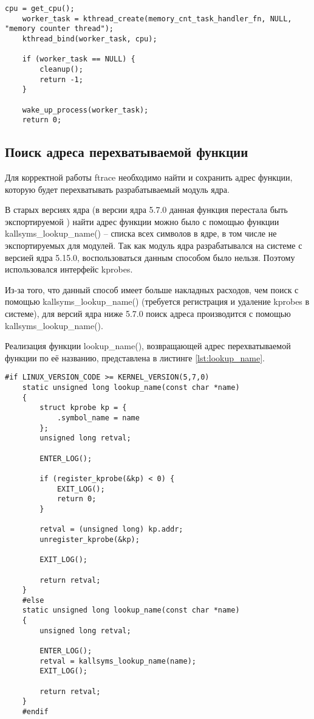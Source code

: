 \begin{lstlisting}[label={lst:threadinit}, caption={инициализация потока ядра}]
	cpu = get_cpu();
	worker_task = kthread_create(memory_cnt_task_handler_fn, NULL, "memory counter thread");
	kthread_bind(worker_task, cpu);
	
	if (worker_task == NULL) {
		cleanup();
		return -1;
	}
	
	wake_up_process(worker_task);
	return 0;
\end{lstlisting}

\subsection{Поиск адреса перехватываемой функции}

Для корректной работы ftrace необходимо найти и сохранить адрес функции, которую будет перехватывать разрабатываемый модуль ядра. 

В старых версиях ядра (в версии ядра 5.7.0 данная функция перестала быть экспортируемой \cite{kallsyms-removed}) найти адрес функции можно было с помощью функции kallsyms\_lookup\_name() -- списка всех символов в ядре, в том числе не экспортируемых для модулей. Так как модуль ядра разрабатывался на системе с версией ядра 5.15.0, воспользоваться данным способом было нельзя. Поэтому использовался интерфейс kprobes.

Из-за того, что данный способ имеет больше накладных расходов, чем поиск с помощью kallsyms\_lookup\_name() (требуется регистрация и удаление kprobes в системе), для версий ядра ниже 5.7.0 поиск адреса производится с помощью kallsyms\_lookup\_name(). 

Реализация функции lookup\_name(), возвращающей адрес перехватываемой функции по её названию, представлена в листинге \ref{lst:lookup_name}.

\begin{lstlisting}[label=lst:lookup_name, caption=Реализация функции lookup\_name()]
	#if LINUX_VERSION_CODE >= KERNEL_VERSION(5,7,0)
	static unsigned long lookup_name(const char *name)
	{
		struct kprobe kp = {
			.symbol_name = name
		};
		unsigned long retval;
		
		ENTER_LOG();
		
		if (register_kprobe(&kp) < 0) {
			EXIT_LOG();
			return 0;
		}
		
		retval = (unsigned long) kp.addr;
		unregister_kprobe(&kp);
		
		EXIT_LOG();
		
		return retval;
	}
	#else
	static unsigned long lookup_name(const char *name)
	{
		unsigned long retval;
		
		ENTER_LOG();
		retval = kallsyms_lookup_name(name);
		EXIT_LOG();
		
		return retval;
	}
	#endif
\end{lstlisting}

